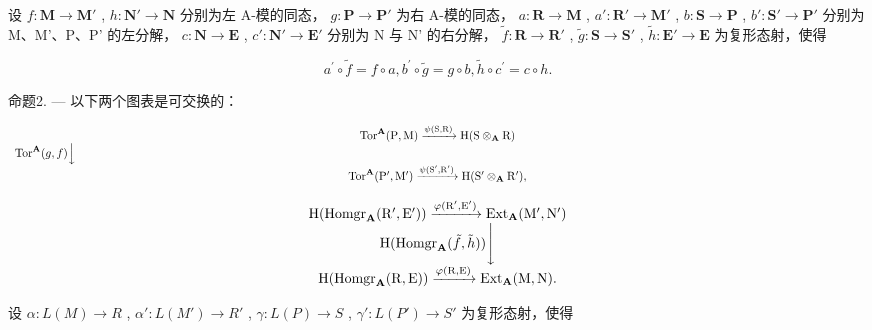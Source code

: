 设 \(f: \mathbf{M} \to \mathbf{M}'\) , \(h: \mathbf{N}' \to \mathbf{N}\) 分别为左 A-模的同态， \(g: \mathbf{P} \to \mathbf{P}'\) 为右 A-模的同态， \(a: \mathbf{R} \to \mathbf{M}\) , \(a': \mathbf{R}' \to \mathbf{M}'\) , \(b: \mathbf{S} \to \mathbf{P}\) , \(b': \mathbf{S}' \to \mathbf{P}'\) 分别为 M、M'、P、P' 的左分解， \(c: \mathbf{N} \to \mathbf{E}\) , \(c': \mathbf{N}' \to \mathbf{E}'\) 分别为 N 与 N' 的右分解， \(\tilde{f}: \mathbf{R} \to \mathbf{R}'\) , \(\tilde{g}: \mathbf{S} \to \mathbf{S}'\) , \(\tilde{h}: \mathbf{E}' \to \mathbf{E}\) 为复形态射，使得

\[
a ^ {\prime} \circ \tilde {f} = f \circ a, b ^ {\prime} \circ \tilde {g} = g \circ b, \tilde {h} \circ c ^ {\prime} = c \circ h.
\]

命题2. --- 以下两个图表是可交换的：

\[
\begin{array}{c} \operatorname{Tor} ^ {\mathbf {A}} (\mathrm{P}, \mathrm{M}) \xrightarrow {\psi (\mathrm{S} , \mathrm{R})} \mathrm{H} (\mathrm{S} \otimes_ {\mathbf {A}} \mathrm{R}) \\ \operatorname{Tor} ^ {\mathbf {A}} (g, f) \Big \downarrow \qquad \qquad \qquad \qquad \qquad \qquad \qquad \qquad \qquad \qquad \qquad \qquad \qquad \qquad \qquad \qquad \qquad \qquad \qquad \qquad \qquad \qquad \qquad \qquad \qquad \qquad \qquad \qquad \qquad \qquad \qquad \qquad \qquad \qquad \\ \operatorname{Tor} ^ {\mathbf {A}} (\mathrm{P} ^ {\prime}, \mathrm{M} ^ {\prime}) \xrightarrow {\psi (\mathrm{S} ^ {\prime} , \mathrm{R} ^ {\prime})} \mathrm{H} (\mathrm{S} ^ {\prime} \otimes_ {\mathbf {A}} \mathrm{R} ^ {\prime})  , \end{array}
\]

\[
\begin{array}{c} \mathrm{H} (\operatorname{Homgr} _ {\mathbf {A}} (\mathrm{R} ^ {\prime}, \mathrm{E} ^ {\prime})) \xrightarrow {\varphi (\mathrm{R} ^ {\prime} , \mathrm{E} ^ {\prime})} \operatorname{Ext} _ {\mathbf {A}} (\mathrm{M} ^ {\prime}, \mathrm{N} ^ {\prime}) \\ \mathrm{H} (\operatorname{Homgr} _ {\mathbf {A}} (\tilde {f}, \tilde {h})) \Biggl \downarrow \\ \mathrm{H} (\operatorname{Homgr} _ {\mathbf {A}} (\mathrm{R}, \mathrm{E})) \xrightarrow {\varphi (\mathrm{R} , \mathrm{E})} \operatorname{Ext} _ {\mathbf {A}} (\mathrm{M}, \mathrm{N}). \end{array}
\]

设 \(\alpha: L(M) \to R\) , \(\alpha': L(M') \to R'\) , \(\gamma: L(P) \to S\) , \(\gamma': L(P') \to S'\) 为复形态射，使得

